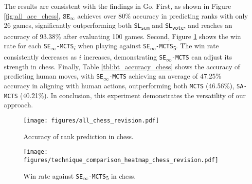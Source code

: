 The results are consistent with the findings in Go.
First, as shown in Figure \ref{fig:all_acc_chess}, $\texttt{SE}_{\infty}$ achieves over 80\% accuracy in predicting ranks with only 26 games, significantly outperforming both \texttt{SL\textsubscript{sum}} and \texttt{SL\textsubscript{vote}}, and reaches an accuracy of 93.38\% after evaluating 100 games.
Second, Figure \ref{fig:fight_chess} shows the win rate for each \texttt{SE\textsubscript{$\infty$}-MCTS\textsubscript{$i$}} when playing against \texttt{SE\textsubscript{$\infty$}-MCTS\textsubscript{5}}.
The win rate consistently decreases as $i$ increases, demonstrating \texttt{SE\textsubscript{$\infty$}-MCTS} can adjust its strength in chess.
Finally, Table \ref{tbl:bt_accuracy_chess} shows the accuracy of predicting human moves, with \texttt{SE\textsubscript{$\infty$}-MCTS} achieving an average of 47.25\% accuracy in aligning with human actions, outperforming both \texttt{MCTS} (46.56\%), \texttt{SA-MCTS} (40.21\%).
In conclusion, this experiment demonstrates the versatility of our approach.


\begin{figure}[htbp]
\centering
\begin{minipage}{0.7\columnwidth}
\begin{minipage}{0.60\linewidth}
    \texttt{[image: figures/all\_chess\_revision.pdf]}
    \caption{Accuracy of rank prediction in chess.}
    \label{fig:all_acc_chess}
\end{minipage}
\hfill
\begin{minipage}{0.38\columnwidth}
 \centering
    \texttt{[image: figures/technique\_comparison\_heatmap\_chess\_revision.pdf]}
     \captionsetup{width=1.2\linewidth}
    \caption{Win rate against \texttt{SE\textsubscript{$\infty$}-MCTS\textsubscript{$5$}} in chess.}

    \label{fig:fight_chess}
\end{minipage}
\end{minipage}
\end{figure}




